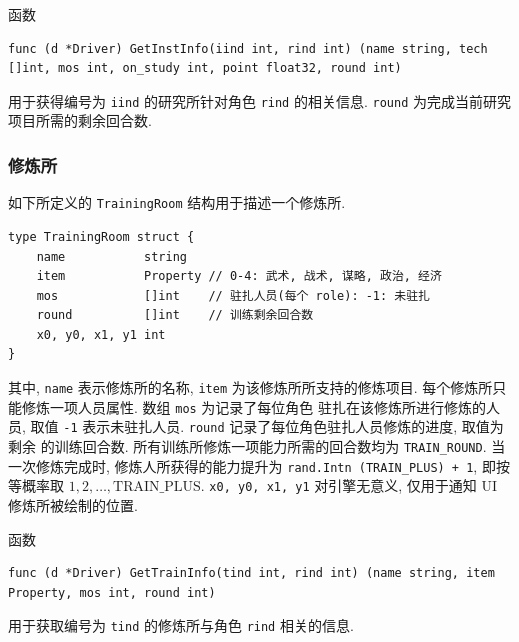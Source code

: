 \documentclass[UTF8, zihao=-4]{ctexart} %
\newcommand{\lcode}{\lstinline} % 段内插入代码
\begin{document}
函数
\begin{lstlisting}
func (d *Driver) GetInstInfo(iind int, rind int) (name string, tech []int, mos int, on_study int, point float32, round int)
\end{lstlisting}
用于获得编号为 \lcode{iind} 的研究所针对角色 \lcode{rind} 的相关信息.
\lcode{round} 为完成当前研究项目所需的剩余回合数.

\subsubsection{修炼所}
如下所定义的 \lcode{TrainingRoom} 结构用于描述一个修炼所.
\begin{lstlisting}
type TrainingRoom struct {
	name           string
	item           Property // 0-4: 武术, 战术, 谋略, 政治, 经济
	mos            []int    // 驻扎人员(每个 role): -1: 未驻扎
	round          []int    // 训练剩余回合数
	x0, y0, x1, y1 int
}
\end{lstlisting}
其中,  \lcode{name} 表示修炼所的名称, \lcode{item} 为该修炼所所支持的修炼项目.
每个修炼所只能修炼一项人员属性. 数组 \lcode{mos} 为记录了每位角色
驻扎在该修炼所进行修炼的人员, 取值 \lcode{-1} 表示未驻扎人员.
\lcode{round} 记录了每位角色驻扎人员修炼的进度, 取值为剩余
的训练回合数. 所有训练所修炼一项能力所需的回合数均为 \lcode{TRAIN_ROUND}.
当一次修炼完成时, 修炼人所获得的能力提升为 \lcode{rand.Intn (TRAIN_PLUS) + 1},
即按等概率取 $1, 2, \ldots, \text{TRAIN\_PLUS}$.
\lcode{x0, y0, x1, y1} 对引擎无意义, 仅用于通知 UI 修炼所被绘制的位置.

函数
\begin{lstlisting}
func (d *Driver) GetTrainInfo(tind int, rind int) (name string, item Property, mos int, round int)
\end{lstlisting}
用于获取编号为 \lcode{tind} 的修炼所与角色 \lcode{rind} 相关的信息.
\end{document}
